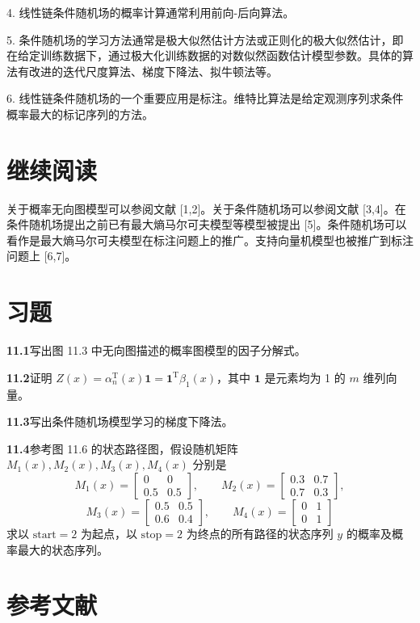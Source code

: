 \documentclass[UTF8,12pt,a4paper,fontset=fandol]{ctexart}
\begin{document}
4. 线性链条件随机场的概率计算通常利用前向-后向算法。

5. 条件随机场的学习方法通常是极大似然估计方法或正则化的极大似然估计，即在给定训练数据下，通过极大化训练数据的对数似然函数估计模型参数。具体的算法有改进的迭代尺度算法、梯度下降法、拟牛顿法等。

6. 线性链条件随机场的一个重要应用是标注。维特比算法是给定观测序列求条件概率最大的标记序列的方法。

\section*{继续阅读}

关于概率无向图模型可以参阅文献 [1,2]。关于条件随机场可以参阅文献 [3,4]。在条件随机场提出之前已有最大熵马尔可夫模型等模型被提出 [5]。条件随机场可以看作是最大熵马尔可夫模型在标注问题上的推广。支持向量机模型也被推广到标注问题上 [6,7]。

\section*{习题}

\noindent\textbf{11.1}\quad 写出图 11.3 中无向图描述的概率图模型的因子分解式。

\noindent\textbf{11.2}\quad 证明 $Z(x)=\alpha_n^{\mathrm T}(x)\mathbf 1=\mathbf 1^{\mathrm T}\beta_1(x)$，其中 $\mathbf 1$ 是元素均为 1 的 $m$ 维列向量。

\noindent\textbf{11.3}\quad 写出条件随机场模型学习的梯度下降法。

\noindent\textbf{11.4}\quad 参考图 11.6 的状态路径图，假设随机矩阵 $M_1(x),M_2(x),M_3(x),M_4(x)$ 分别是
\[
M_1(x)=
\begin{bmatrix}
0&0\\
0.5&0.5
\end{bmatrix},\qquad
M_2(x)=
\begin{bmatrix}
0.3&0.7\\
0.7&0.3
\end{bmatrix},
\]
\[
M_3(x)=
\begin{bmatrix}
0.5&0.5\\
0.6&0.4
\end{bmatrix},\qquad
M_4(x)=
\begin{bmatrix}
0&1\\
0&1
\end{bmatrix}
\]
求以 $\mathrm{start}=2$ 为起点，以 $\mathrm{stop}=2$ 为终点的所有路径的状态序列 $y$ 的概率及概率最大的状态序列。

\section*{参考文献}
\end{document}
